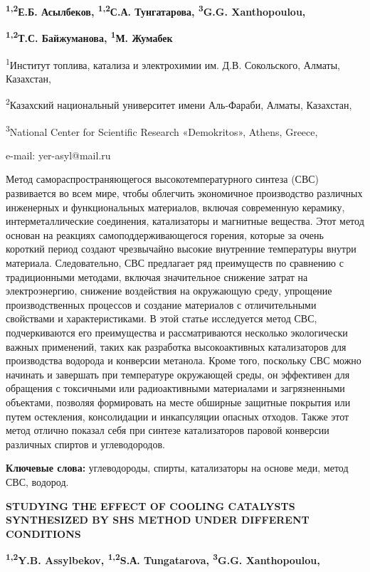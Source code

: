 {\bfseries \textsuperscript{1,2}Е.Б. Асылбеков, \textsuperscript{1,2}С.А.
Тунгатарова, \textsuperscript{3}G.G. Xanthopoulou,}

{\bfseries \textsuperscript{1,2}Т.С. Байжуманова, \textsuperscript{1}М.
Жумабек}

\textsuperscript{1}Институт топлива, катализа и электрохимии им. Д.В.
Сокольского, Алматы, Казахстан,

\textsuperscript{2}Казахский национальный университет имени Аль-Фараби,
Алматы, Казахстан,

\textsuperscript{3}National Center for Scientific Research «Demokritos»,
Athens, Greece,

e-mail: yer-asyl@mail.ru

Метод самораспространяющегося высокотемпературного синтеза (СВС)
развивается во всем мире, чтобы облегчить экономичное производство
различных инженерных и функциональных материалов, включая современную
керамику, интерметаллические соединения, катализаторы и магнитные
вещества. Этот метод основан на реакциях самоподдерживающегося горения,
которые за очень короткий период создают чрезвычайно высокие внутренние
температуры внутри материала. Следовательно, СВС предлагает ряд
преимуществ по сравнению с традиционными методами, включая значительное
снижение затрат на электроэнергию, снижение воздействия на окружающую
среду, упрощение производственных процессов и создание материалов с
отличительными свойствами и характеристиками. В этой статье исследуется
метод СВС, подчеркиваются его преимущества и рассматриваются несколько
экологически важных применений, таких как разработка высокоактивных
катализаторов для производства водорода и конверсии метанола. Кроме
того, поскольку СВС можно начинать и завершать при температуре
окружающей среды, он эффективен для обращения с токсичными или
радиоактивными материалами и загрязненными объектами, позволяя
формировать на месте обширные защитные покрытия или путем остекления,
консолидации и инкапсуляции опасных отходов. Также этот метод отлично
показал себя при синтезе катализаторов паровой конверсии различных
спиртов и углеводородов.

{\bfseries Ключевые слова:} углеводороды, спирты, катализаторы на основе
меди, метод СВС, водород.

{\bfseries STUDYING THE EFFECT OF COOLING CATALYSTS SYNTHESIZED BY SHS
METHOD UNDER DIFFERENT CONDITIONS}

{\bfseries \textsuperscript{1,2}Y.B. Assylbekov, \textsuperscript{1,2}S.А.
Tungatarova, \textsuperscript{3}G.G. Xanthopoulou,}

